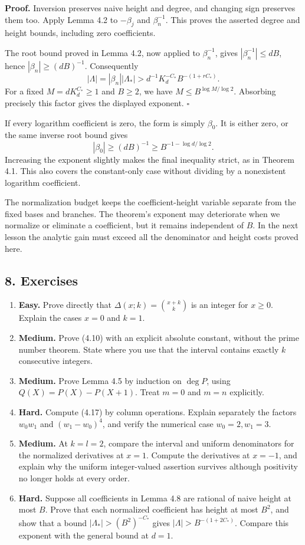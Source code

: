 \documentclass[
  11pt,
  a4paper,
]{article}
\newcounter{none} %
\begin{document}
\textbf{Proof.} Inversion preserves naive height and degree, and
changing sign preserves them too. Apply Lemma 4.2 to \(-\beta_j\) and
\(\beta_n^{-1}\). This proves the asserted degree and height bounds,
including zero coefficients.

The root bound proved in Lemma 4.2, now applied to \(\beta_n^{-1}\),
gives \(|\beta_n^{-1}|\le dB\), hence \(|\beta_n|\ge(dB)^{-1}\).
Consequently \[
|\Lambda|=|\beta_n||\Lambda_*|
>d^{-1}K_d^{-C_*}B^{-(1+rC_*)}.
\] For a fixed \(M=dK_d^{C_*}\ge1\) and \(B\ge2\), we have
\(M\le B^{\log M/\log2}\). Absorbing precisely this factor gives the
displayed exponent. \(\square\)

If every logarithm coefficient is zero, the form is simply \(\beta_0\).
It is either zero, or the same inverse root bound gives \[
|\beta_0|\ge(dB)^{-1}\ge B^{-1-\log d/\log2}.
\] Increasing the exponent slightly makes the final inequality strict,
as in Theorem 4.1. This also covers the constant-only case without
dividing by a nonexistent logarithm coefficient.

The normalization budget keeps the coefficient-height variable separate
from the fixed bases and branches. The theorem's exponent may
deteriorate when we normalize or eliminate a coefficient, but it remains
independent of \(B\). In the next lesson the analytic gain must exceed
all the denominator and height costs proved here.

\subsection{8. Exercises}\label{exercises}

\begin{enumerate}
\def\labelenumi{\arabic{enumi}.}
\item
  \textbf{Easy.} Prove directly that \(\Delta(x;k)=\binom{x+k}{k}\) is
  an integer for \(x\ge0\). Explain the cases \(x=0\) and \(k=1\).
\item
  \textbf{Medium.} Prove (4.10) with an explicit absolute constant,
  without the prime number theorem. State where you use that the
  interval contains exactly \(k\) consecutive integers.
\item
  \textbf{Medium.} Prove Lemma 4.5 by induction on \(\deg P\), using
  \(Q(X)=P(X)-P(X+1)\). Treat \(m=0\) and \(m=n\) explicitly.
\item
  \textbf{Hard.} Compute (4.17) by column operations. Explain separately
  the factors \(w_0w_1\) and \((w_1-w_0)^4\), and verify the numerical
  case \(w_0=2,w_1=3\).
\item
  \textbf{Medium.} At \(k=l=2\), compare the interval and uniform
  denominators for the normalized derivatives at \(x=1\). Compute the
  derivatives at \(x=-1\), and explain why the uniform integer-valued
  assertion survives although positivity no longer holds at every order.
\item
  \textbf{Hard.} Suppose all coefficients in Lemma 4.8 are rational of
  naive height at most \(B\). Prove that each normalized coefficient has
  height at most \(B^2\), and show that a bound
  \(|\Lambda_*|>(B^2)^{-C_*}\) gives \(|\Lambda|>B^{-(1+2C_*)}\).
  Compare this exponent with the general bound at \(d=1\).
\end{enumerate}
\end{document}

